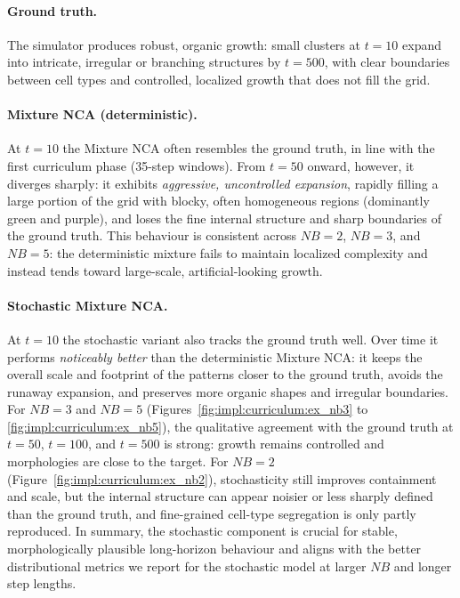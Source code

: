 \paragraph{Ground truth.}
The simulator produces robust, organic growth: small clusters at \(t=10\) expand into intricate, irregular or branching structures by \(t=500\), with clear boundaries between cell types and controlled, localized growth that does not fill the grid.

\paragraph{Mixture NCA (deterministic).}
At \(t=10\) the Mixture NCA often resembles the ground truth, in line with the first curriculum phase (35-step windows).
From \(t=50\) onward, however, it diverges sharply: it exhibits \emph{aggressive, uncontrolled expansion}, rapidly filling a large portion of the grid with blocky, often homogeneous regions (dominantly green and purple), and loses the fine internal structure and sharp boundaries of the ground truth.
This behaviour is consistent across \(NB=2\), \(NB=3\), and \(NB=5\): the deterministic mixture fails to maintain localized complexity and instead tends toward large-scale, artificial-looking growth.

\paragraph{Stochastic Mixture NCA.}
At \(t=10\) the stochastic variant also tracks the ground truth well.
Over time it performs \emph{noticeably better} than the deterministic Mixture NCA: it keeps the overall scale and footprint of the patterns closer to the ground truth, avoids the runaway expansion, and preserves more organic shapes and irregular boundaries.
For \(NB=3\) and \(NB=5\) (Figures~\ref{fig:impl:curriculum:ex_nb3} to \ref{fig:impl:curriculum:ex_nb5}), the qualitative agreement with the ground truth at \(t=50\), \(t=100\), and \(t=500\) is strong: growth remains controlled and morphologies are close to the target.
For \(NB=2\) (Figure~\ref{fig:impl:curriculum:ex_nb2}), stochasticity still improves containment and scale, but the internal structure can appear noisier or less sharply defined than the ground truth, and fine-grained cell-type segregation is only partly reproduced.
In summary, the stochastic component is crucial for stable, morphologically plausible long-horizon behaviour and aligns with the better distributional metrics we report for the stochastic model at larger \(NB\) and longer step lengths.

